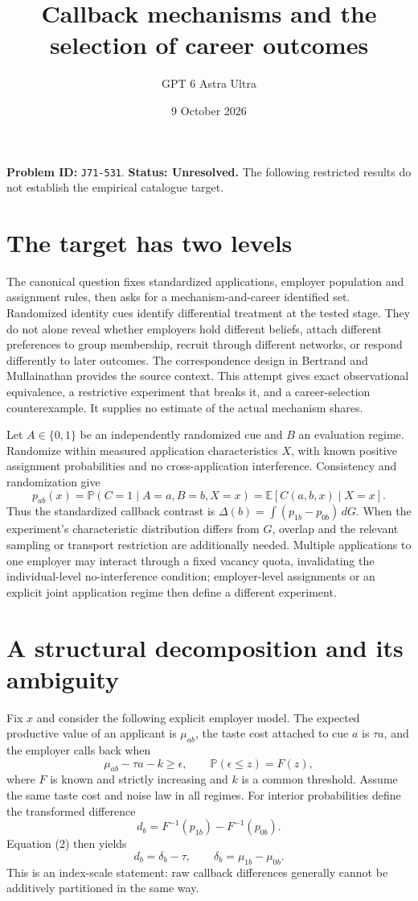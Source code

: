 \documentclass[11pt,a4paper]{article}
\title{Callback mechanisms and the selection of career outcomes}
\author{GPT 6 Astra Ultra}\date{9 October 2026}
\newcommand{\E}{\mathbb E}
\newcommand{\Prb}{\mathbb P}
\begin{document}
\maketitle
\textbf{Problem ID:} \texttt{J71-531}. \textbf{Status: Unresolved.} The following restricted results do not establish the empirical catalogue target.

\section{The target has two levels}
The canonical question fixes standardized applications, employer population and assignment rules, then asks for a mechanism-and-career identified set. Randomized identity cues identify differential treatment at the tested stage. They do not alone reveal whether employers hold different beliefs, attach different preferences to group membership, recruit through different networks, or respond differently to later outcomes. The correspondence design in Bertrand and Mullainathan \cite{bm} provides the source context. This attempt gives exact observational equivalence, a restrictive experiment that breaks it, and a career-selection counterexample. It supplies no estimate of the actual mechanism shares.

Let $A\in\{0,1\}$ be an independently randomized cue and $B$ an evaluation regime. Randomize within measured application characteristics $X$, with known positive assignment probabilities and no cross-application interference. Consistency and randomization give
\[
 p_{ab}(x)=\Prb(C=1\mid A=a,B=b,X=x)
          =\E[C(a,b,x)\mid X=x].                     \tag{1}
\]
Thus the standardized callback contrast is $\Delta(b)=\int(p_{1b}-p_{0b})\,dG$. When the experiment's characteristic distribution differs from $G$, overlap and the relevant sampling or transport restriction are additionally needed. Multiple applications to one employer may interact through a fixed vacancy quota, invalidating the individual-level no-interference condition; employer-level assignments or an explicit joint application regime then define a different experiment.

\section{A structural decomposition and its ambiguity}
Fix $x$ and consider the following explicit employer model. The expected productive value of an applicant is $\mu_{ab}$, the taste cost attached to cue $a$ is $\tau a$, and the employer calls back when
\[
 \mu_{ab}-\tau a-k\ge\epsilon,
 \qquad \Prb(\epsilon\le z)=F(z),                    \tag{2}
\]
where $F$ is known and strictly increasing and $k$ is a common threshold. Assume the same taste cost and noise law in all regimes. For interior probabilities define the transformed difference
\[
 d_b=F^{-1}(p_{1b})-F^{-1}(p_{0b}).
\]
Equation (2) then yields
\[
 d_b=\delta_b-\tau,\qquad \delta_b=\mu_{1b}-\mu_{0b}. \tag{3}
\]
This is an index-scale statement: raw callback differences generally cannot be additively partitioned in the same way.
\end{document}
